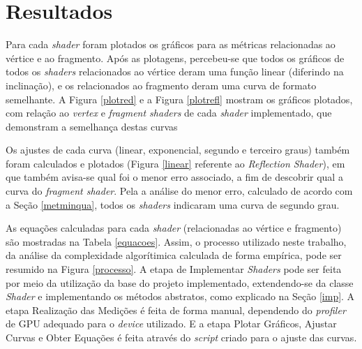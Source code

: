 \chapter[Resultados]{Resultados}
\label{result}

	Para cada \textit{shader} foram plotados os gráficos para as métricas relacionadas ao vértice e ao fragmento. Após as plotagens, percebeu-se que todos os gráficos de todos os \textit{shaders} relacionados ao vértice deram uma função linear (diferindo na inclinação), e os relacionados ao fragmento deram uma curva de formato semelhante. A Figura \ref{plotred} e a Figura \ref{plotrefl} mostram os gráficos plotados, com relação ao \textit{vertex} e \textit{fragment shaders} de cada \textit{shader} implementado, que demonstram a semelhança destas curvas

	 Os ajustes de cada curva (linear, exponencial, segundo e terceiro graus) também foram calculados e plotados (Figura \ref{linear} referente ao \textit{Reflection Shader}), em que também avisa-se qual foi o menor erro associado, a fim de descobrir qual a curva do \textit{fragment shader}. Pela a análise do menor erro, calculado de acordo com a Seção \ref{metminqua}, todos os \textit{shaders} indicaram uma curva de segundo grau.

	As equações calculadas para cada \textit{shader} (relacionadas ao vértice e fragmento) são mostradas na Tabela \ref{equacoes}. Assim, o processo utilizado neste trabalho, da análise da complexidade algorítimica calculada de forma empírica, pode ser resumido na Figura \ref{processo}. A etapa de Implementar \textit{Shaders} pode ser feita por meio da utilização da base do projeto implementado, extendendo-se da classe \textit{Shader} e implementando os métodos abstratos, como explicado na Seção \ref{imp}. A etapa Realização das Medições é feita de forma manual, dependendo do \textit{profiler} de GPU adequado para o \textit{device} utilizado. E a etapa Plotar Gráficos, Ajustar Curvas e Obter Equações é feita através do \textit{script} criado para o ajuste das curvas.

